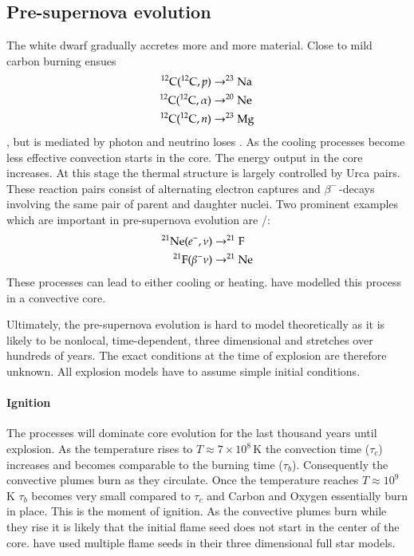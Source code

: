 \subsection{Pre-supernova evolution}
The white dwarf gradually accretes more and more material. Close to \mchan mild carbon burning ensues
\begin{align}
\nonumber
\Carb(\Carb,p) &\rightarrow \Na \\  \nonumber
\Carb(\Carb,\alpha) &\rightarrow \Ne \\ 
\Carb(\Carb,n) &\rightarrow \Mg[23]
\end{align},
but is mediated by photon and neutrino loses \citep{2005NuPhA.758..463L, 2007nps..book.....I}. As the cooling processes become less effective convection starts in the core. The energy output in the core increases. At this stage the thermal structure is largely controlled by Urca pairs. These reaction pairs consist of alternating electron captures and $\beta^-$\,-decays involving the same pair of parent and daughter nuclei. Two prominent examples which are important in pre-supernova evolution are \Ne[21]/\F[21]:
\begin{align}
\nonumber
\Ne[21](e^-, \nu) &\rightarrow \F[21] \\
\F[21](\beta^- \nu) &\rightarrow \Ne[21]
\end{align}
These processes can lead to either cooling or heating. \cite{2005NuPhA.758..463L} have modelled this process in a convective core. 

Ultimately, the pre-supernova evolution is hard to model theoretically as it is likely to be nonlocal, time-dependent, three dimensional and stretches over hundreds of years. The exact conditions at the time of explosion are therefore unknown. All explosion models have to assume simple initial conditions. 

\paragraph{Ignition}
The \urca processes will dominate core evolution for the last thousand years until explosion. As the temperature rises to $T\approx7 \times 10^8$\,K \citep{2000ARA&A..38..191H} the convection time ($\tau_c$) increases and becomes comparable to the burning time ($\tau_b$). Consequently the convective plumes burn as they circulate. Once the temperature reaches $T\approx 10^9$\,K $\tau_b$ becomes very small compared to $\tau_c$ and Carbon and Oxygen essentially burn in place. 
This is the moment of ignition. As the convective plumes burn while they rise it is likely that the initial flame seed does not start in the center of the core. \cite{2005A&A...431..635R} have used multiple flame seeds in their three dimensional full star models.

